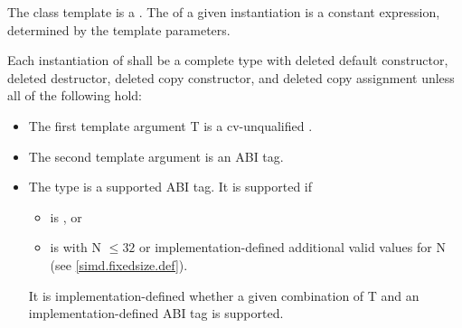 

\pnum The class template \simd{} is a \dataparalleltype.
The \width of a given \simd instantiation is a constant expression, determined by the template parameters.

\newcommand\simdTypeRequirements[1]{
\pnum\label{#1.type requirements}\label{#1.deleted}%
Each instantiation of \type{#1} shall be a complete type with deleted default constructor, deleted destructor, deleted copy constructor, and deleted copy assignment unless all of the following hold:
\begin{itemize}
  \item The first template argument \type T is a cv-unqualified \realArithmeticType.
  \item The second template argument \type{Abi} is an ABI tag.
  \item The \type{Abi} type is a supported ABI tag.
    It is supported if
    \begin{itemize}
      \item \type{Abi} is \type{simd_abi::scalar}, or
      \item \type{Abi} is \fixedsizeN with \code N $\le 32$ or implementation-defined additional valid values for \code N (see \ref{simd.fixedsize.def}).
    \end{itemize}
    It is implementation-defined whether a given combination of \type T and an implementation-defined ABI tag is supported.
\end{itemize}
}
\simdTypeRequirements{simd}


